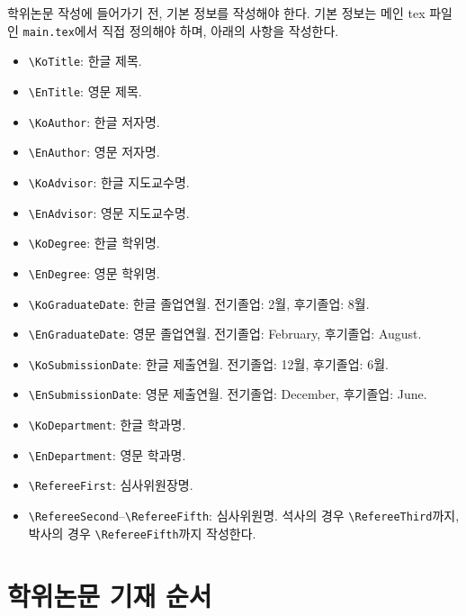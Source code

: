 \documentclass[ko]{UOSThesis}
\begin{document}
학위논문 작성에 들어가기 전, 기본 정보를 작성해야 한다. 기본 정보는 메인 tex 파일인 \texttt{main.tex}에서 직접 정의해야 하며, 아래의 사항을 작성한다.
\begin{itemize}
\small
\singlespacing
    \item \texttt{\textbackslash KoTitle}: 한글 제목.
    \item \texttt{\textbackslash EnTitle}: 영문 제목.
    \item \texttt{\textbackslash KoAuthor}: 한글 저자명.
    \item \texttt{\textbackslash EnAuthor}: 영문 저자명.
    \item \texttt{\textbackslash KoAdvisor}: 한글 지도교수명.
    \item \texttt{\textbackslash EnAdvisor}: 영문 지도교수명.
    \item \texttt{\textbackslash KoDegree}: 한글 학위명.
    \item \texttt{\textbackslash EnDegree}: 영문 학위명.
    \item \texttt{\textbackslash KoGraduateDate}: 한글 졸업연월. 전기졸업: 2월, 후기졸업: 8월.
    \item \texttt{\textbackslash EnGraduateDate}: 영문 졸업연월. 전기졸업: February, 후기졸업: August.
    \item \texttt{\textbackslash KoSubmissionDate}: 한글 제출연월. 전기졸업: 12월, 후기졸업: 6월.
    \item \texttt{\textbackslash EnSubmissionDate}: 영문 제출연월. 전기졸업: December, 후기졸업: June.
    \item \texttt{\textbackslash KoDepartment}: 한글 학과명.
    \item \texttt{\textbackslash EnDepartment}: 영문 학과명.
    \item \texttt{\textbackslash RefereeFirst}: 심사위원장명.
    \item \texttt{\textbackslash RefereeSecond}--\texttt{\textbackslash RefereeFifth}: 심사위원명. 석사의 경우 \texttt{\textbackslash RefereeThird}까지, 박사의 경우 \texttt{\textbackslash RefereeFifth}까지 작성한다.
\end{itemize}

\chapter{학위논문 기재 순서}
\label{chap:order}
\end{document}

